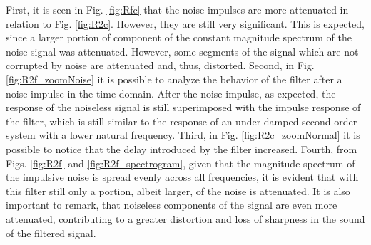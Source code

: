 \documentclass[a4paper, oneside, 11pt]{article}
\begin{document}
First, it is seen in Fig. \ref{fig:Rfc} that the noise impulses are more attenuated in relation to Fig. \ref{fig:R2c}. However, they are still very significant. This is expected, since a larger portion of component of the constant magnitude spectrum of the noise signal was attenuated. However, some segments of the signal which are not corrupted by noise are attenuated and, thus, distorted. Second, in Fig. \ref{fig:R2f_zoomNoise} it is possible to analyze the behavior of the filter after a noise impulse in the time domain. After the noise impulse, as expected, the response of the noiseless signal is still superimposed with the impulse response of the filter, which is still similar to the response of an under-damped second order system with a lower natural frequency. Third, in Fig. \ref{fig:R2c_zoomNormal} it is possible to notice that the delay introduced by the filter increased. Fourth, from Figs. \ref{fig:R2f} and \ref{fig:R2f_spectrogram}, given that the magnitude spectrum of the impulsive noise is spread evenly across all frequencies, it is evident that with this filter still only a portion, albeit larger, of the noise is attenuated. It is also important to remark, that noiseless components of the signal are even more attenuated, contributing to a greater distortion and loss of sharpness in the sound of the filtered signal.
\end{document}
